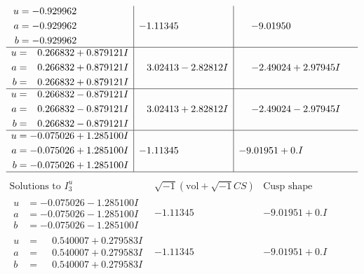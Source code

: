 \documentclass[1p]{elsarticle_modified}
\theoremstyle{definition}
\newcommand{\I}{\sqrt{-1}}
\begin{document}
$$\begin{array}{c|c|c}
\begin{aligned}
u &= -0.929962\phantom{ +0.000000I} \\
a &= -0.929962\phantom{ +0.000000I} \\
b &= -0.929962\phantom{ +0.000000I}\end{aligned}
 & -1.11345\phantom{ +0.000000I} & -9.01950\phantom{ +0.000000I} \\ \hline\begin{aligned}
u &= \phantom{-}0.266832 + 0.879121 I \\
a &= \phantom{-}0.266832 + 0.879121 I \\
b &= \phantom{-}0.266832 + 0.879121 I\end{aligned}
 & \phantom{-}3.02413 - 2.82812 I & -2.49024 + 2.97945 I \\ \hline\begin{aligned}
u &= \phantom{-}0.266832 - 0.879121 I \\
a &= \phantom{-}0.266832 - 0.879121 I \\
b &= \phantom{-}0.266832 - 0.879121 I\end{aligned}
 & \phantom{-}3.02413 + 2.82812 I & -2.49024 - 2.97945 I \\ \hline\begin{aligned}
u &= -0.075026 + 1.285100 I \\
a &= -0.075026 + 1.285100 I \\
b &= -0.075026 + 1.285100 I\end{aligned}
 & -1.11345\phantom{ +0.000000I} & -9.01951 + 0. I\phantom{ +0.000000I}\\
 \hline 
 \end{array}$$\newpage$$\begin{array}{c|c|c}  
\text{Solutions to }I^u_{3}& \I (\text{vol} + \sqrt{-1}CS) & \text{Cusp shape}\\
 \hline 
\begin{aligned}
u &= -0.075026 - 1.285100 I \\
a &= -0.075026 - 1.285100 I \\
b &= -0.075026 - 1.285100 I\end{aligned}
 & -1.11345\phantom{ +0.000000I} & -9.01951 + 0. I\phantom{ +0.000000I} \\ \hline\begin{aligned}
u &= \phantom{-}0.540007 + 0.279583 I \\
a &= \phantom{-}0.540007 + 0.279583 I \\
b &= \phantom{-}0.540007 + 0.279583 I\end{aligned}
 & -1.11345\phantom{ +0.000000I} & -9.01951 + 0. I\phantom{ +0.000000I} \\ \hline\begin{aligned}

\end{aligned}
\end{array}$$
\end{document}
